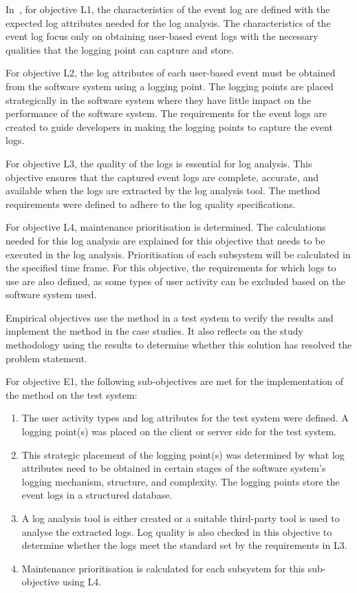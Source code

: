 \begin{enumerate}[label=\textbf{\Roman*.}]
    In~, for objective L1, the characteristics of the event log are defined with the expected log attributes needed for the log analysis. The characteristics of the event log focus only on obtaining user-based event logs with the necessary qualities that the logging point can capture and store. \par For objective L2, the log attributes of each user-based event must be obtained from the software system using a logging point. The logging points are placed strategically in the software system where they have little impact on the performance of the software system. The requirements for the event logs are created to guide developers in making the logging points to capture the event logs. \par For objective L3, the quality of the logs is essential for log analysis. This objective ensures that the captured event logs are complete, accurate, and available when the logs are extracted by the log analysis tool. The method requirements were defined to adhere to the log quality specifications. \par For objective L4, maintenance prioritisation is determined. The calculations needed for this log analysis are explained for this objective that needs to be executed in the log analysis. Prioritisation of each subsystem will be calculated in the specified time frame. For this objective, the requirements for which logs to use are also defined, as some types of user activity can be excluded based on the software system used. \par Empirical objectives use the method in a test system to verify the results and implement the method in the case studies. It also reflects on the study methodology using the results to determine whether this solution has resolved the problem statement. \par For objective E1, the following sub-objectives are met for the implementation of the method on the test system:

	\begin{enumerate}
		\item The user activity types and log attributes for the test system were defined. A logging point(s) was placed on the client or server side for the test system.
		\item This strategic placement of the logging point(s) was determined by what log attributes need to be obtained in certain stages of the software system's logging mechanism, structure, and complexity. The logging points store the event logs in a structured database.
		\item A log analysis tool is either created or a suitable third-party tool is used to analyse the extracted logs. Log quality is also checked in this objective to determine whether the logs meet the standard set by the requirements in L3. 
		\item Maintenance prioritisation is calculated for each subsystem for this sub-objective using L4.
	\end{enumerate} 


\end{enumerate}
